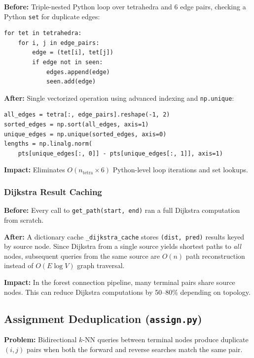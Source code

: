 \documentclass[11pt,a4paper]{article}
\begin{document}
\textbf{Before:} Triple-nested Python loop over tetrahedra and 6 edge pairs, checking a Python \texttt{set} for duplicate edges:
\begin{lstlisting}
for tet in tetrahedra:
    for i, j in edge_pairs:
        edge = (tet[i], tet[j])
        if edge not in seen:
            edges.append(edge)
            seen.add(edge)
\end{lstlisting}

\textbf{After:} Single vectorized operation using advanced indexing and \texttt{np.unique}:
\begin{lstlisting}
all_edges = tetra[:, edge_pairs].reshape(-1, 2)
sorted_edges = np.sort(all_edges, axis=1)
unique_edges = np.unique(sorted_edges, axis=0)
lengths = np.linalg.norm(
    pts[unique_edges[:, 0]] - pts[unique_edges[:, 1]], axis=1)
\end{lstlisting}

\textbf{Impact:} Eliminates $O(n_{\text{tetra}} \times 6)$ Python-level loop iterations and set lookups.

\subsubsection{Dijkstra Result Caching}

\textbf{Before:} Every call to \texttt{get\_path(start, end)} ran a full Dijkstra computation from scratch.

\textbf{After:} A dictionary cache \texttt{\_dijkstra\_cache} stores \texttt{(dist, pred)} results keyed by source node. Since Dijkstra from a single source yields shortest paths to \emph{all} nodes, subsequent queries from the same source are $O(n)$ path reconstruction instead of $O(E \log V)$ graph traversal.

\textbf{Impact:} In the forest connection pipeline, many terminal pairs share source nodes. This can reduce Dijkstra computations by 50--80\% depending on topology.

\subsection{Assignment Deduplication (\texttt{assign.py})}

\textbf{Problem:} Bidirectional $k$-NN queries between terminal nodes produce duplicate $(i,j)$ pairs when both the forward and reverse searches match the same pair.
\end{document}
